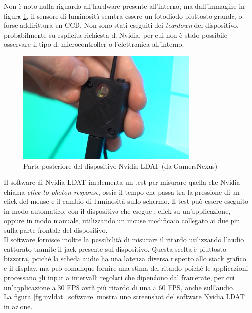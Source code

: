Non è noto nulla riguardo all'hardware presente all'interno, ma dall'immagine in figura \ref{fig:nvldat_back}, il sensore di luminosità sembra essere un fotodiodo piuttosto grande, o forse addirittura un CCD. Non sono stati eseguiti dei \textit{teardown} del dispositivo, probabilmente su esplicita richiesta di Nvidia, per cui non è stato possibile osservare il tipo di microcontroller o l'elettronica all'interno.

\begin{figure}[h!]
	\centering
	\includegraphics[width=0.8\textwidth]{StatoDellArte_files/nvldat_back.jpg}
	\caption{Parte posteriore del dispositivo Nvidia LDAT (da GamersNexus)}
	\label{fig:nvldat_back}
\end{figure}

Il software di Nvidia LDAT implementa un test per misurare quella che Nvidia chiama \textit{click-to-photon response}, ossia il tempo che passa tra la pressione di un click del mouse e il cambio di luminosità sullo schermo. Il test può essere eseguito in modo automatico, con il dispositivo che esegue i click su un'applicazione, oppure in modo manuale, utilizzando un mouse modificato collegato ai due pin sulla parte frontale del dispositivo.\\
Il software fornisce inoltre la possibilità di misurare il ritardo utilizzando l'audio catturato tramite il jack presente sul dispositivo. Questa scelta è piuttosto bizzarra, poiché la scheda audio ha una latenza diversa rispetto allo stack grafico e il display, ma può comunque fornire una stima del ritardo poiché le applicazioni processano gli input a intervalli regolari che dipendono dal framerate, per cui un'applicazione a 30 FPS avrà più ritardo di una a 60 FPS, anche sull'audio.\\
La figura \ref{fig:nvldat_software} mostra uno screenshot del software Nvidia LDAT in azione.

